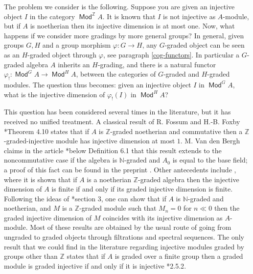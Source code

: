 \documentclass[11pt,fleqn]{article}
\newcommand\NN{\mathbb N}
\newcommand\ZZ{\mathbb Z}
\renewcommand\to{\longrightarrow}
\renewcommand\phi{\varphi}
\DeclareMathOperator\Mod{\mathsf{Mod}}
\begin{document}
The problem we consider is the following. Suppose you are given an injective 
object $I$ in the category $\Mod^\ZZ A$. It is known that $I$ is not 
injective as $A$-module, but if $A$ is noetherian then 
its injective dimension is at most one. Now, what happens if we consider more 
gradings by more general groups? In general, given groups $G, H$ and 
a group morphism $\phi: G \to H$, any $G$-graded object can be seen as an 
$H$-graded object through $\phi$, see paragraph \ref{cog-functors}. In 
particular a $G$-graded algebra $A$ inherits an $H$-grading, and there is a 
natural functor $\phi_!: \Mod^G A \to \Mod^H A$, between the categories of 
$G$-graded and $H$-graded modules. The question thus becomes: given an 
injective object $I$ in $\Mod^G A$, what is the injective dimension of 
$\phi_!(I)$ in $\Mod^H A$?

This question has been considered several times in the literature, but it has 
received no unified treatment. A classical result of R. Fossum and H.-B. Foxby 
\cite{FF-graded}*{Theorem 4.10} states that if $A$ is $\ZZ$-graded noetherian 
and commutative then a $\ZZ$-graded-injective module has injective dimension 
at most $1$. M. Van den Bergh claims in the article 
\cite{VdB-existence-dc}*{below Definition 6.1} that this result extends to the 
noncommutative case if the algebra is $\NN$-graded and $A_0$ is equal to the 
base field; a proof of this fact can be found in the preprint \cite{Yek-note}. 
Other antecedents include \cite{Eks-auslander}, where it is shown that if $A$ 
is a noetherian $\ZZ$-graded algebra then the injective dimension of $A$ is 
finite if and only if its graded injective dimension is finite. Following the 
ideas of \cite{Lev-ncreg}*{section 3}, one can show that if $A$ is 
$\NN$-graded and noetherian, and $M$ is a $\ZZ$-graded module such that $M_n 
= 0$ for $n \ll 0$ then the graded injective dimension of $M$ coincides with 
its injective dimension as $A$-module. Most of these results are obtained by 
the usual route of going from ungraded to graded objects through filtrations 
and spectral sequences. The only result that we could find in the literature 
regarding injective modules graded by groups other than $\ZZ$ states that if 
$A$ is graded over a finite group then a graded module is graded injective if 
and only if it is injective \cite{NV-graded-book3}*{2.5.2}. 
\end{document}
